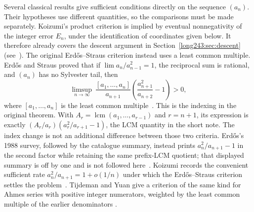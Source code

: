 \documentclass[11pt]{article}
\begin{document}
Several classical results give sufficient conditions directly on the
sequence $(a_n)$. Their hypotheses use different quantities, so the
comparisons must be made separately. Koizumi's product criterion is
implied by eventual nonnegativity of the integer error $E_n$, under the
identification of coordinates given below. It therefore already covers
the descent argument in Section~\ref{long243:sec:descent}
(see~\cite[Cor.~4(1) and Prop.~1(1), pp.~14--15]{koizumi2025}).
The original Erd\H{o}s--Straus criterion instead uses a least common multiple.
Erd\H{o}s and Straus proved that if $\lim a_n/a_{n-1}^{2}=1$, the reciprocal
sum is rational, and $(a_n)$ has no Sylvester tail, then
\[
 \limsup_{n\to\infty}\ \frac{[a_1,\ldots,a_n]}{a_{n+1}}
 \left(\frac{a_{n+1}^{2}}{a_{n+2}}-1\right)>0,
\]
where $[a_1,\ldots,a_n]$ is the least common
multiple~\cite[Theorem~3, p.~132]{erdosstraus1964}.  This is the indexing in
the original theorem. With $A_r=\operatorname{lcm}(a_1,\ldots,a_{r-1})$
and $r=n+1$, its expression is exactly
$(A_r/a_r)(a_r^2/a_{r+1}-1)$, the LCM quantity in the short note.
The index change is not an additional difference between those two
criteria. Erd\H{o}s's 1988 survey, followed by the
catalogue summary, instead prints $a_n^2/a_{n+1}-1$ in the second factor while
retaining the same prefix-LCM quotient; that displayed summary is off by one
and is not followed here~\cite[p.~105]{erdos1988}\cite{erdosproblems}.
Koizumi records the convenient sufficient rate
$a_n^2/a_{n+1}=1+o(1/n)$ under which the Erd\H{o}s--Straus criterion settles
the problem~\cite[Remark~3, p.~16]{koizumi2025}.  Tijdeman and Yuan give a
criterion of the same kind for Ahmes series with positive integer numerators,
weighted by the least common multiple of the earlier denominators
\cite{tijdemanyuan2002}.
\end{document}
